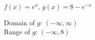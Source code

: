 {$f(x) = e^{x}$, $g(x) = 8 - e^{-x}$}
{Domain of $g$:  $(-\infty, \infty)$\\
 Range of $g$:  $(-\infty, 8)$ \\
 
\begin{center}
\end{center}}

